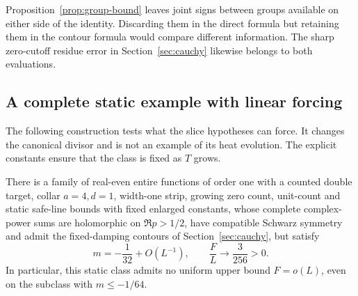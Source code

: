 Proposition~\ref{prop:group-bound} leaves joint signs between groups
available on either side of the identity. Discarding them in the direct
formula but retaining them in the contour formula would compare
different information. The sharp zero-cutoff residue error in
Section~\ref{sec:cauchy} likewise belongs to both evaluations.

\subsection{A complete static example with linear forcing}

The following construction tests what the slice hypotheses can force.
It changes the canonical divisor and is not an example of its heat
evolution. The explicit constants ensure that the class is fixed as
$T$ grows.

\begin{proposition}\label{prop:static}
There is a family of real-even entire functions of order one with a
counted double target, collar $a=4,d=1$, width-one strip, growing zero
count, unit-count and static safe-line bounds with fixed enlarged
constants, whose complete complex-power sums are holomorphic on
$\Re p>1/2$, have compatible Schwarz symmetry and admit the fixed-damping
contours of Section~\ref{sec:cauchy}, but satisfy
\begin{equation}
 m=-\frac1{32}+O(L^{-1}),\qquad \frac FL\longrightarrow\frac3{256}>0.
 \label{eq:static-asymptotic}
\end{equation}
In particular, this static class admits no uniform upper bound $F=o(L)$,
even on the subclass with $m\le-1/64$.
\end{proposition}

